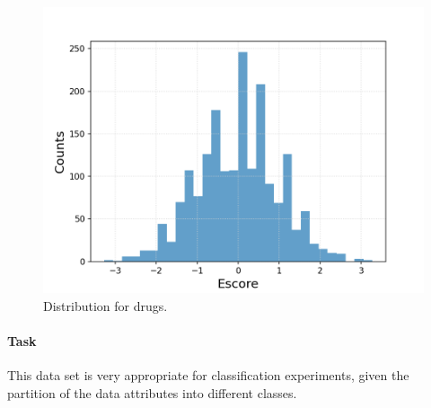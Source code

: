 \documentclass{article}
\begin{document}
\begin{figure}[h!]
\begin{minipage}[b]{0.32\textwidth}
	\end{minipage}
	\begin{minipage}[b]{0.32\textwidth}
		\includegraphics[width=\textwidth]{plots/drugsPlots/Escore.png}
	\end{minipage}
	\caption{Distribution for drugs.}
	\label{drugs3}
\end{figure}



\paragraph{Task}

This data set is very appropriate for classification experiments, given the partition of the data attributes into different classes.



\newpage
{}

\end{document}
